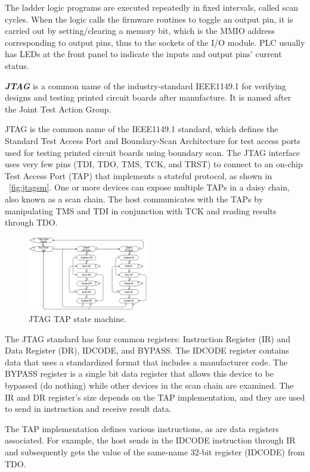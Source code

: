 The ladder logic programs are executed repeatedly in fixed intervals, called scan cycles. When the logic calls the firmware routines to toggle an output pin, it is carried out by setting/clearing a memory bit, which is the MMIO address corresponding to output pins, thus to the sockets of the I/O module. PLC usually has LEDs at the front panel to indicate the inputs and output pins' current status.


\textbf{\textit{JTAG}} is a common name of the industry-standard IEEE1149.1 for verifying designs and testing printed circuit boards after manufacture. It is named after the Joint Test Action Group.

JTAG is the common name of the IEEE1149.1 standard, which defines the Standard Test Access Port and Boundary-Scan Architecture for test access ports used for testing printed circuit boards using boundary scan. The JTAG interface uses very few pins (TDI, TDO, TMS, TCK, and TRST) to connect to an on-chip Test Access Port (TAP) that implements a stateful protocol, as shown in ~\autoref{fig:jtagsm}.  One or more devices can expose multiple TAPs in a daisy chain, also known as a scan chain. The host communicates with the TAPs by manipulating TMS and TDI in conjunction with TCK and reading results through TDO. 

\begin{figure}[ht]
	\includegraphics[width=0.47\textwidth]{figures/jtagsm}
	\centering
	\caption{JTAG TAP state machine.}
	\label{fig:jtagsm}
\end{figure}


The JTAG standard has four common registers: Instruction Register (IR) and Data Register (DR),  IDCODE, and BYPASS. The IDCODE register contains data that uses a standardized format that includes a manufacturer code. The BYPASS register is a single bit data register that allows this device to be bypassed (do nothing) while other devices in the scan chain are examined. The IR and DR register's size depends on the TAP implementation, and they are used to send in instruction and receive result data.

The TAP implementation defines various instructions, as are data registers associated. For example, the host sends in the IDCODE instruction through IR and subsequently gets the value of the same-name 32-bit register (IDCODE) from TDO.

